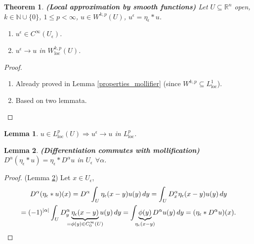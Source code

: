 \documentclass[12pt]{article}
\newtheorem{lemma}{Lemma}[section]
\newtheorem{theorem}{Theorem}[section]
\theoremstyle{definition}
\begin{document}
\begin{theorem}\label{local_approx_smooth}
\emph{\textbf{(Local approximation by smooth functions)}} Let $U\subseteq\mathbb R^n$ open, $k\in\mathbb N\cup\{0\}$, $1\leq p<\infty$, $u\in W^{k,p}(U)$, $u^\epsilon=\eta_\epsilon*u$.

\begin{enumerate}[label=(\roman*)]
\item $u^\epsilon\in C^\infty(U_\epsilon)$.

\item\label{conv_Sobolev_loc} $u^\epsilon\rightarrow u$ in $W_\text{loc}^{k,p}(U)$.
\end{enumerate}
\end{theorem}

\begin{proof}
\begin{enumerate}[label=(\roman*)]
\item Already proved in Lemma \ref{properties_mollifier} (since $W^{k,p}\subseteq L_\text{loc}^1$).

\item Based on two lemmata.
\end{enumerate}
\end{proof}

\begin{lemma}\label{conv_moll_loc}
$u\in L_\text{loc}^p(U)\Rightarrow u^\epsilon\rightarrow u$ in $L_\text{loc}^p$.
\end{lemma}

\begin{lemma}\label{diff_comm_moll}
\emph{\textbf{(Differentiation commutes with mollification)}} $D^\alpha(\eta_\epsilon*u)=\eta_\epsilon*D^\alpha u$ in $U_\epsilon$ $\forall\alpha$.
\end{lemma}

\begin{proof}
(Lemma \ref{diff_comm_moll}) Let $x\in U_\epsilon$,
\begin{multline*}
D^\alpha(\eta_\epsilon*u)(x)=D^\alpha\int_U\eta_\epsilon(x-y)u(y)\,dy=\int_UD_x^\alpha\eta_\epsilon(x-y)u(y)\,dy\\
=(-1)^{|\alpha|}\int_UD_y^\alpha\underbrace{\eta_\epsilon(x-y)}_{\mathclap{=\phi(y)\in C_0^\infty(U)}}u(y)\,dy=\int\underbrace{\phi(y)}_{\mathclap{\eta_\epsilon(x-y)}}D^\alpha u(y)\,dy=(\eta_\epsilon*D^\alpha u)(x).
\end{multline*}
\end{proof}
\end{document}
